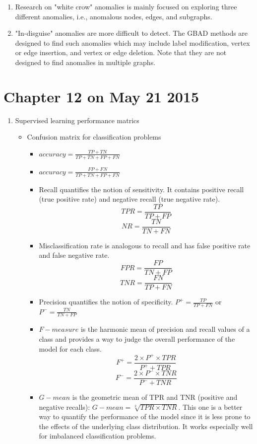 \documentclass[14pt]{article}
\begin{document}
\begin{enumerate}
 \item Research on "white crow" anomalies is mainly focused on exploring three different anomalies, i.e., anomalous nodes, edges, and subgraphs. 
 
 \item "In-disguise" anomalies are more difficult to detect. The GBAD methods are designed to find such anomalies which may include label modification, vertex or edge insertion, and vertex or edge deletion. Note that they are not designed to find anomalies in multiple graphs.
\end{enumerate}

\section{Chapter 12 on May 21 2015}
\begin{enumerate}
 \item Supervised learning performance matrics
  \begin{itemize}
   \item Confusion matrix for classification problems
    \begin{itemize}
     \item $accuracy = \frac{TP+TN}{TP+TN+FP+FN}$
     \item $accuracy = \frac{FP+FN}{TP+TN+FP+FN}$
     \item Recall quantifies the notion of sensitivity. It contains positive recall (true positive rate) and negative recall (true negative rate).  $$TPR = \frac{TP}{TP+FP}$$ $$NR=\frac{TN}{TN+FN}$$
     \item Misclassification rate is analogous to recall and has false positive rate and false negative rate. 
     $$FPR = \frac{FP}{TN+FP}$$ $$TNR=\frac{FN}{TP+FN}$$
     \item Precision quantifies the notion of specificity. $P^+ = \frac{TP}{TP+FN}$ or $P^- = \frac{TN}{TN+FP}$
     \item $F-measure$ is the harmonic mean of precision and recall values of a class and provides a way to judge the overall performance of the model for each class. 
     $$F^+ = \frac{2 \times P^+ \times TPR}{P^+ + TPR}$$
     $$F^- = \frac{2 \times P^- \times TNR}{P^- + TNR}$$
     \item $G-mean$ is the geometric mean of TPR and TNR (positive and negative recalls): $G-mean = \sqrt[2]{TPR \times TNR}$. This one is a better way to quantify the performance of the model since it is less prone to the effects of the underlying class distribution. It works especially well for imbalanced classification problems.

\end{itemize}
\end{itemize}
\end{enumerate}
\end{document}
